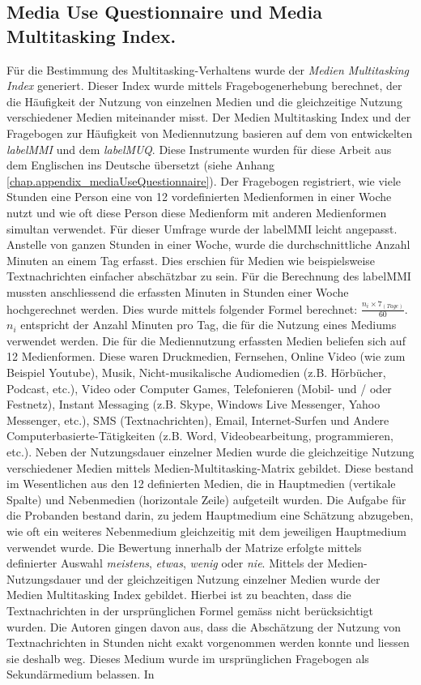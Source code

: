 \subsection{Media Use Questionnaire und Media Multitasking Index.}\label{subsection.muq}
Für die Bestimmung des Multitasking-Verhaltens wurde der \textit{Medien Multitasking Index} generiert. Dieser Index wurde mittels Fragebogenerhebung berechnet, der die Häufigkeit der Nutzung von einzelnen Medien und die gleichzeitige Nutzung verschiedener Medien miteinander misst. Der Medien Multitasking Index und der Fragebogen zur Häufigkeit von Mediennutzung basieren auf dem von  entwickelten \textit{\gls{labelMMI}} und dem \textit{\gls{labelMUQ}}. Diese Instrumente wurden für diese Arbeit aus dem Englischen ins Deutsche übersetzt (siehe Anhang \ref{chap.appendix_mediaUseQuestionnaire}). Der Fragebogen registriert, wie viele Stunden eine Person eine von 12 vordefinierten Medienformen in einer Woche nutzt und wie oft diese Person diese Medienform mit anderen Medienformen simultan verwendet. Für dieser Umfrage wurde der \gls{labelMMI} leicht angepasst. Anstelle von ganzen Stunden in einer Woche, wurde die durchschnittliche Anzahl Minuten an einem Tag erfasst. Dies erschien für Medien wie beispielsweise Textnachrichten einfacher abschätzbar zu sein. Für die Berechnung des \gls{labelMMI} mussten anschliessend die erfassten Minuten in Stunden einer Woche hochgerechnet werden. Dies wurde mittels folgender Formel berechnet: \(\frac{n_{i} \times 7_{(Tage)}}{60}\). \(n_{i}\) entspricht der Anzahl Minuten pro Tag, die für die Nutzung eines Mediums verwendet werden. Die für die Mediennutzung erfassten Medien beliefen sich auf 12 Medienformen. Diese waren Druckmedien, Fernsehen, Online Video (wie zum Beispiel Youtube), Musik, Nicht-musikalische Audiomedien (z.B. Hörbücher, Podcast, etc.), Video oder Computer Games, Telefonieren (Mobil- und / oder Festnetz), Instant Messaging (z.B. Skype, Windows Live Messenger, Yahoo Messenger, etc.), SMS (Textnachrichten), Email, Internet-Surfen und Andere Computerbasierte-Tätigkeiten (z.B. Word, Videobearbeitung, programmieren, etc.). Neben der Nutzungsdauer einzelner Medien wurde die gleichzeitige Nutzung verschiedener Medien mittels Medien-Multitasking-Matrix gebildet. Diese bestand im Wesentlichen aus den 12 definierten Medien, die in Hauptmedien (vertikale Spalte) und Nebenmedien (horizontale Zeile) aufgeteilt wurden. Die Aufgabe für die Probanden bestand darin, zu jedem Hauptmedium eine Schätzung abzugeben, wie oft ein weiteres Nebenmedium gleichzeitig mit dem jeweiligen Hauptmedium verwendet wurde. Die Bewertung innerhalb der Matrize erfolgte mittels definierter Auswahl \textit{meistens}, \textit{etwas}, \textit{wenig} oder \textit{nie}. Mittels der Medien-Nutzungsdauer und der gleichzeitigen Nutzung einzelner Medien wurde der Medien Multitasking Index gebildet. Hierbei ist zu beachten, dass die Textnachrichten in der ursprünglichen Formel gemäss \cite{Ophir2009}  nicht berücksichtigt wurden. Die Autoren gingen davon aus, dass die Abschätzung der Nutzung von Textnachrichten in Stunden nicht exakt vorgenommen werden konnte und liessen sie deshalb weg. Dieses Medium wurde im ursprünglichen Fragebogen als Sekundärmedium belassen. In 